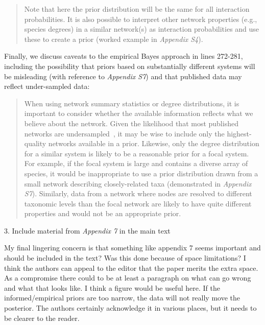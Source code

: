\documentclass[12pt]{letter}
\newenvironment{refquote}{\bigskip \begin{it}}{\end{it}\smallskip}
\begin{document}
		\begin{quotation}

		Note that here the prior distribution will be the same for all interaction probabilities. It is also possible to interpret other network properties (e.g., species degrees) in a similar network(s) as interaction probabilities and use these to create a prior (worked example in \emph{Appendix S4}).

		\end{quotation}


		Finally, we discuss caveats to the empirical Bayes approach in lines 272-281, including the possibility that priors based on substantially different systems will be misleading (with reference to \emph{Appendix S7}) and that published data may reflect under-sampled data:


		\begin{quotation}

			When using network summary statistics or degree distributions, it is important to consider whether the available information reflects what we believe about the network. Given the likelihood that most published networks are undersampled~\citep{Jordano2016}, it may be wise to include only the highest-quality networks available in a prior. Likewise, only the degree distribution for a similar system is likely to be a reasonable prior for a focal system. For example, if the focal system is large and contains a diverse array of species, it would be inappropriate to use a prior distribution drawn from a small network describing closely-related taxa (demonstrated in \emph{Appendix S7}). Similarly, data from a network where nodes are resolved to different taxonomic levels than the focal network are likely to have quite different properties and would not be an appropriate prior.

		\end{quotation}




	3. Include material from \emph{Appendix 7} in the main text

		\begin{refquote}
		
			My final lingering concern is that something like appendix 7 seems important and should be included in the text? Was this done because of space limitations? I think the authors can appeal to the editor that the paper merits the extra space. As a compromise there could to be at least a paragraph on what can go wrong and what that looks like. I think a figure would be useful here. If the informed/empirical priors are too narrow, the data will not really move the posterior. The authors certainly acknowledge it in various places, but it needs to be clearer to the reader.

		\end{refquote}
\end{document}
